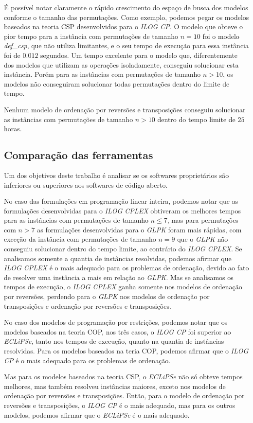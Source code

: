 É possível notar claramente o rápido crescimento do espaço de busca
dos modelos conforme o tamanho das permutações. Como exemplo, podemos
pegar os modelos baseados na teoria CSP desenvolvidos para
o \textit{ILOG CP}. O modelo que obteve o pior tempo para a instância
com permutações de tamanho $n = 10$ foi o modelo \textit{def\_csp},
que não utiliza limitantes, e o seu tempo de execução para essa
instância foi de $0.012$ segundos. Um tempo excelente para o modelo
que, diferentemente dos modelos que utilizam as operações
isoladamente, conseguiu solucionar esta instância. Porém para as
instâncias com permutações de tamanho $n > 10$, os modelos não
conseguiram solucionar todas permutações dentro do limite de tempo.

Nenhum modelo de ordenação por reversões e transposições conseguiu
solucionar as instâncias com permutações de tamanho $n > 10$ dentro do
tempo limite de $25$ horas.



\subsection{Comparação das ferramentas}
\label{subsec:analise_ferramentas}
Um dos objetivos deste trabalho é analisar se os softwares
proprietários são inferiores ou superiores aos softwares de código
aberto.

No caso das formulações em programação linear inteira, podemos notar
que as formulações desenvolvidas para o \textit{ILOG CPLEX} obtiveram
os melhores tempos para as instâncias com permutações de tamanho
$n \le 7$, mas para permutações com $n > 7$ as formulações
desenvolvidas para o \textit{GLPK} foram mais rápidas, com exceção da
instância com permutações de tamanho $n = 9$ que o \textit{GLPK} não
conseguiu solucionar dentro do tempo limite, ao contrário
do \textit{ILOG CPLEX}. Se analisamos somente a quantia de instâncias
resolvidas, podemos afirmar que \textit{ILOG CPLEX} é o mais adequado
para os problemas de ordenação, devido ao fato de resolver uma
instância a mais em relação ao \textit{GLPK}. Mas se analisamos os
tempos de execução, o \textit{ILOG CPLEX} ganha somente nos modelos de
ordenação por reversões, perdendo para o \textit{GLPK} nos modelos de
ordenação por transposições e ordenação por reversões e transposições.

No caso dos modelos de programação por restrições, podemos notar que
os modelos baseados na teoria COP, nos três casos, o \textit{ILOG CP}
foi superior ao \textit{ECLiPSe}, tanto nos tempos de execução, quanto
na quantia de instâncias resolvidas. Para os modelos baseados na teria
COP, podemos afirmar que o \textit{ILOG CP} é o mais adequado para os
problemas de ordenação.

Mas para os modelos baseados na teoria CSP, o \textit{ECLiPSe} não só
obteve tempos melhores, mas também resolveu instâncias maiores, exceto
nos modelos de ordenação por reversões e transposições. Então, para o
modelo de ordenação por reversões e transposições, o \textit{ILOG CP}
é o mais adequado, mas para os outros modelos, podemos afirmar que
o \textit{ECLiPSe} é o mais adequado.
